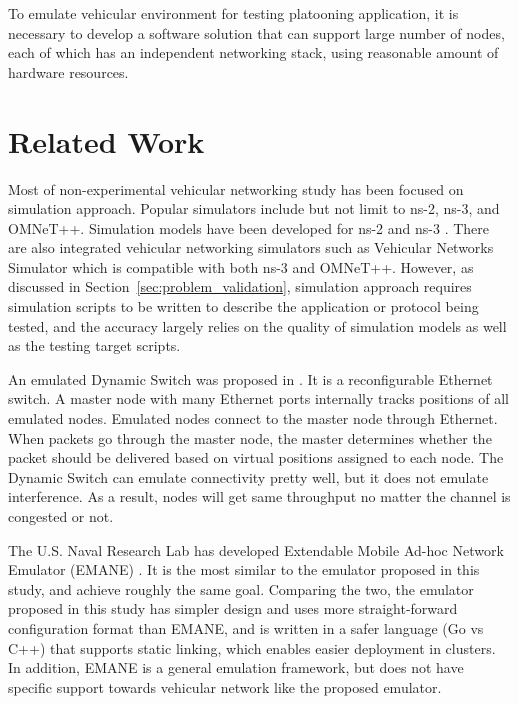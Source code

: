 \documentclass[12pt]{report}
\begin{document}
To emulate vehicular environment for testing platooning application, it is necessary to develop a software solution that can support large number of nodes, each of which has an independent networking stack, using reasonable amount of hardware resources.


\section{Related Work}

Most of non-experimental vehicular networking study has been focused on simulation approach. Popular simulators include but not limit to ns-2, ns-3\cite{henderson2008network}, and OMNeT++\cite{varga2008overview}. Simulation models have been developed for ns-2 \cite{Chen2006ns2} and ns-3 \cite{Arbabi2010ns3,benin2012ns3}. There are also integrated vehicular networking simulators such as Vehicular Networks Simulator \cite{fernandes2012} which is compatible with both ns-3 and OMNeT++. However, as discussed in Section~\ref{sec:problem_validation}, simulation approach requires simulation scripts to be written to describe the application or protocol being tested, and the accuracy largely relies on the quality of simulation models as well as the testing target scripts.

An emulated Dynamic Switch was proposed in \cite{lin2004mobile}. It is a reconfigurable Ethernet switch. A master node with many Ethernet ports internally tracks positions of all emulated nodes. Emulated nodes connect to the master node through Ethernet. When packets go through the master node, the master determines whether the packet should be delivered based on virtual positions assigned to each node. The Dynamic Switch can emulate connectivity pretty well, but it does not emulate interference. As a result, nodes will get same throughput no matter the channel is congested or not.

The U.S. Naval Research Lab has developed Extendable Mobile Ad-hoc Network Emulator (EMANE) \cite{EMANE}. It is the most similar to the emulator proposed in this study, and achieve roughly the same goal. Comparing the two, the emulator proposed in this study has simpler design and uses more straight-forward configuration format than EMANE, and is written in a safer language (Go vs C++) that supports static linking, which enables easier deployment in clusters. In addition, EMANE is a general emulation framework, but does not have specific support towards vehicular network like the proposed emulator.
\end{document}
